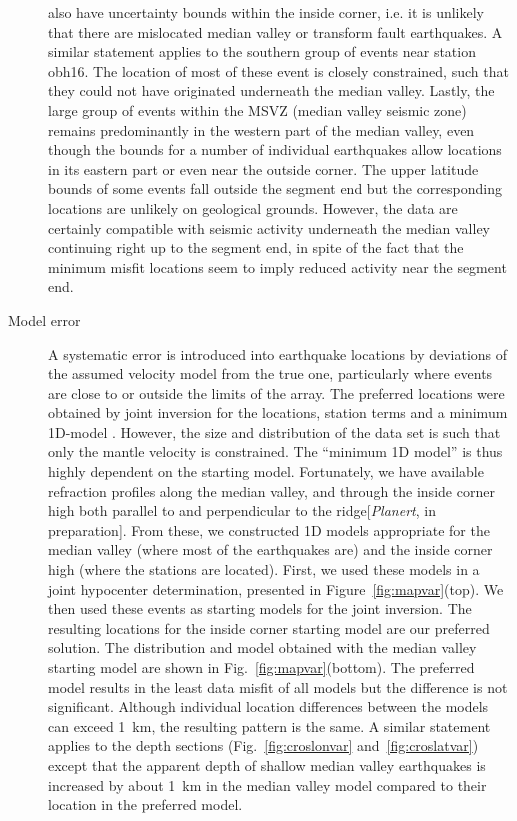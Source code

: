 \documentclass[jgr]{agu2001}
\newlength{\tw}
\begin{document}
\begin{article}
\begin{description}
also have uncertainty bounds within the inside corner, i.e. it is unlikely
that there are mislocated median valley or transform fault
earthquakes.  A similar statement applies to the southern group of
events near station obh16.  The location of most of these event is
closely constrained, such that they could not have originated underneath
the median valley.   Lastly, the large group of events within the MSVZ
(median valley seismic zone) remains predominantly in the western part of the median
valley, even though the bounds for a number of individual earthquakes
allow locations in its eastern part or even near the outside corner.
The upper latitude bounds of
some events fall outside the segment end but the corresponding locations are
unlikely on geological grounds.  However, the data are certainly
compatible with seismic activity underneath the
median valley continuing right up to the segment end, in spite of the
fact that the minimum misfit locations seem to imply reduced activity
near the segment end. 

\item[Model error]
A systematic error is introduced into earthquake locations by
deviations of the assumed velocity model from the true one, particularly where
events are close to or outside the limits of the array.  The preferred
locations were obtained by joint inversion for the locations,
station terms and a minimum 1D-model \citep[using
VELEST][]{kissling94}. However, the size and distribution of the data
set is such that only the mantle velocity is constrained.
The ``minimum 1D model'' is thus highly dependent on the starting
model.  Fortunately, we have available refraction profiles along the median
valley, and through the inside corner high both parallel to and
perpendicular to the ridge[{\it Planert},
in preparation].  From these, we constructed 1D models appropriate for
the median valley (where most of the earthquakes are) and the inside
corner high (where the stations are located).  First, we used these
models in a joint hypocenter determination, presented in Figure~\ref{fig:mapvar}(top).
We then used these
events as starting models for the joint inversion. The resulting
locations for the inside corner starting model are our preferred
solution. The distribution and model obtained with the median valley
starting model are shown in Fig.~\ref{fig:mapvar}(bottom).  The
preferred model results in the least data misfit of all models but the
difference is not significant.  Although individual location
differences between the models can exceed 1~km, the resulting pattern
is the same.  A similar statement applies to the depth sections
(Fig.~\ref{fig:croslonvar} and~\ref{fig:croslatvar}) except that the
apparent depth of shallow median valley earthquakes is 
increased by about 1~km in the median valley model compared to their
location in the preferred model.


\end{description}
\end{article}
\end{document}
